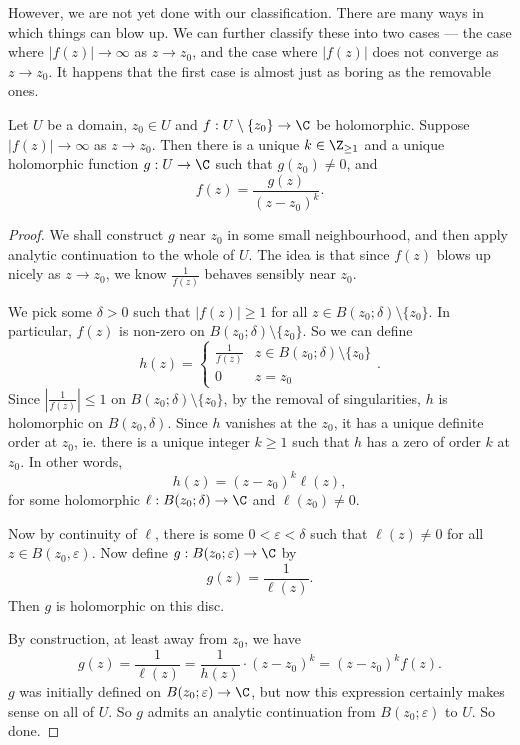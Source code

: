 \documentclass[a4paper]{article}
\begin{document}
However, we are not yet done with our classification. There are many ways in which things can blow up. We can further classify these into two cases --- the case where $|f(z)| \to \infty$ as $z \to z_0$, and the case where $|f(z)|$ does not converge as $z \to z_0$. It happens that the first case is almost just as boring as the removable ones.

\begin{prop}
  Let $U$ be a domain, $z_0 \in U$ and $f: U \setminus \{z_0\} \to \C$ be holomorphic. Suppose $|f(z)| \to \infty$ as $z \to z_0$. Then there is a unique $k \in \Z_{\geq 1}$ and a unique holomorphic function $g: U \to \C$ such that $g(z_0) \not= 0$, and
  \[
    f(z) = \frac{g(z)}{(z - z_0)^k}.
  \]
\end{prop}

\begin{proof}
  We shall construct $g$ near $z_0$ in some small neighbourhood, and then apply analytic continuation to the whole of $U$. The idea is that since $f(z)$ blows up nicely as $z \to z_0$, we know $\frac{1}{f(z)}$ behaves sensibly near $z_0$.

  We pick some $\delta > 0$ such that $|f(z)| \geq 1$ for all $z \in B(z_0; \delta) \setminus \{z_0\}$. In particular, $f(z)$ is non-zero on $B(z_0; \delta)\setminus \{z_0\}$. So we can define
  \[
    h(z) =
    \begin{cases}
      \frac{1}{f(z)} & z \in B(z_0; \delta) \setminus \{z_0\}\\
      0 & z = z_0
    \end{cases}.
  \]
  Since $|\frac{1}{f(z)}| \leq 1$ on $B(z_0; \delta) \setminus \{z_0\}$, by the removal of singularities, $h$ is holomorphic on $B(z_0, \delta)$. Since $h$ vanishes at the $z_0$, it has a unique definite order at $z_0$, ie. there is a unique integer $k \geq 1$ such that $h$ has a zero of order $k$ at $z_0$. In other words,
  \[
    h(z) = (z - z_0)^k \ell(z),
  \]
  for some holomorphic $\ell: B(z_0; \delta) \to \C$ and $\ell(z_0) \not= 0$.

  Now by continuity of $\ell$, there is some $0 < \varepsilon < \delta$ such that $\ell (z) \not= 0$ for all $z \in B(z_0, \varepsilon)$. Now define $g: B(z_0; \varepsilon) \to \C$ by
  \[
    g(z) = \frac{1}{\ell(z)}.
  \]
  Then $g$ is holomorphic on this disc.

  By construction, at least away from $z_0$, we have
  \[
    g(z) = \frac{1}{\ell(z)} = \frac{1}{h(z)} \cdot (z - z_0)^k = (z - z_0)^k f(z).
  \]
  $g$ was initially defined on $B(z_0; \varepsilon) \to \C$, but now this expression certainly makes sense on all of $U$. So $g$ admits an analytic continuation from $B(z_0; \varepsilon)$ to $U$. So done.
\end{proof}
\end{document}
